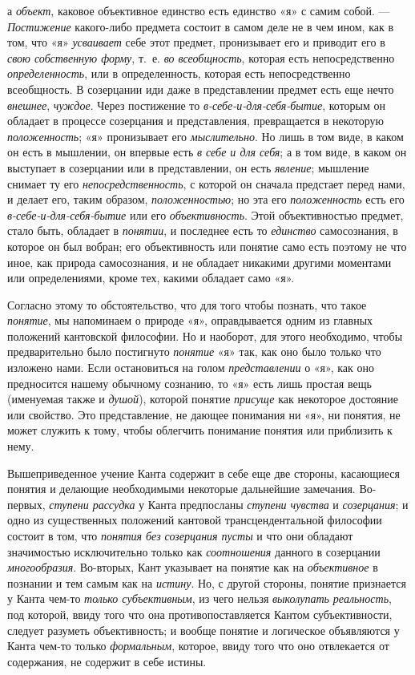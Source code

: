 \documentclass[twoside]{article}
\begin{document}
{{а {\em объект}, каковое объективное единство есть единство «я» с самим собой. —
{\em Постижение} какого-либо предмета состоит в самом деле не в чем ином, как
в том, что «я» {\em усваивает} себе этот предмет, пронизывает его и приводит его 
в {\em свою собственную форму}, т.~е. {\em во всеобщность}, которая есть 
непосредственно {\em определенность}, или в определенность, которая есть 
непосредственно всеобщность. В созерцании иди даже в представлении предмет 
есть еще нечто {\em внешнее}, {\em чуждое}. Через постижение то
{\em в-себе-и-для-себя-бытие}, которым он обладает в процессе созерцания и 
представления, превращается в некоторую {\em положенность}; «я» пронизывает 
его {\em мыслительно}. Но лишь в том виде, в каком он есть в мышлении, он 
впервые есть {\em в себе и для себя}; а в том виде, в каком он выступает в 
созерцании или в представлении, он есть {\em явление}; мышление снимает ту 
его {\em непосредственность}, с которой он сначала предстает перед нами, и 
делает его, таким образом, {\em положенностью}; но эта его {\em положенность} 
есть его {\em в-себе-и-для-себя-бытие} или его {\em объективность}. Этой
объективностью предмет, стало быть, обладает в {\em понятии}, и последнее 
есть то {\em единство} самосознания, в которое он был вобран; его 
объективность или понятие само есть поэтому не что иное, как природа 
самосознания, и не обладает никакими другими моментами или определениями, 
кроме тех, какими обладает само «я».

Согласно этому то обстоятельство, что для того чтобы познать,
что такое {\em понятие},
мы напоминаем о природе «я», оправдывается одним из главных
положений кантовской философии. Но и наоборот, для этого необходимо, чтобы
предварительно было постигнуто
{\em понятие} «я» так,
как оно было только что изложено нами. Если остановиться на голом
{\em представлении} о
«я», как оно предносится нашему обычному сознанию, то «я» есть лишь простая
вещь (именуемая также и {\em душой}),
которой понятие
{\em присуще} как
некоторое достояние или свойство. Это представление, не дающее понимания ни
«я», ни понятия, не может служить к тому, чтобы облегчить понимание понятия
или приблизить к нему.

Вышеприведенное учение Канта содержит в себе еще две стороны,
касающиеся понятия и делающие необходимыми некоторые дальнейшие замечания.
Во-первых, {\em ступени рассудка}
у Канта предпосланы
{\em ступени чувства} и
{\em созерцания}; и одно
из существенных положений кантовой трансцендентальной философии состоит в
том, что {\em понятия без созерцания
пусты} и что они обладают значимостью исключительно только
как {\em соотношения}
данного в созерцании
{\em многообразия}.
Во-вторых, Кант указывает на понятие как на
{\em объективное} в
познании и тем самым как на
{\em истину}. Но, с
другой стороны, понятие признается у Канта чем-то
{\em только субъективным},
из чего нельзя
{\em выколупать реальность},
под которой, ввиду того что она противопоставляется Кантом
субъективности, следует разуметь объективность; и вообще понятие и
логическое объявляются у Канта чем-то только
{\em формальным},
которое, ввиду того что оно отвлекается от содержания, не
содержит в себе истины.

}}
\end{document}
